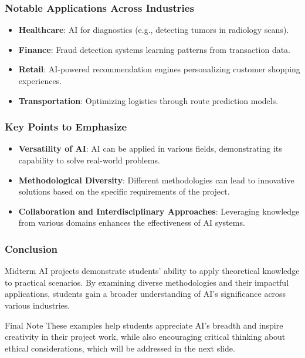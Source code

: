 \documentclass{beamer}
\begin{document}
\begin{frame}[fragile]
    \frametitle{Notable Applications Across Industries}
    \begin{itemize}
        \item \textbf{Healthcare}: AI for diagnostics (e.g., detecting tumors in radiology scans).
        \item \textbf{Finance}: Fraud detection systems learning patterns from transaction data.
        \item \textbf{Retail}: AI-powered recommendation engines personalizing customer shopping experiences.
        \item \textbf{Transportation}: Optimizing logistics through route prediction models.
    \end{itemize}
\end{frame}

\begin{frame}[fragile]
    \frametitle{Key Points to Emphasize}
    \begin{itemize}
        \item \textbf{Versatility of AI}: AI can be applied in various fields, demonstrating its capability to solve real-world problems.
        \item \textbf{Methodological Diversity}: Different methodologies can lead to innovative solutions based on the specific requirements of the project.
        \item \textbf{Collaboration and Interdisciplinary Approaches}: Leveraging knowledge from various domains enhances the effectiveness of AI systems.
    \end{itemize}
\end{frame}

\begin{frame}[fragile]
    \frametitle{Conclusion}
    Midterm AI projects demonstrate students' ability to apply theoretical knowledge to practical scenarios. By examining diverse methodologies and their impactful applications, students gain a broader understanding of AI's significance across various industries.

    \begin{block}{Final Note}
        These examples help students appreciate AI's breadth and inspire creativity in their project work, while also encouraging critical thinking about ethical considerations, which will be addressed in the next slide.
    \end{block}
\end{frame}
\end{document}
